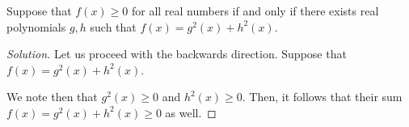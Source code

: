 \documentclass[openany]{book}
\newenvironment{solution}{\begin{proof}[Solution]}{\end{proof}}
\newcommand{\CC}{\mathbb{C}}
\newcommand{\RR}{\mathbb{R}}
\begin{document}
\begin{hw}
	Suppose that $f(x) \geq 0$ for all real numbers if and only if there exists real polynomials $g,h$ such that $f(x) = g^{2}(x) + h^{2}(x)$.
\end{hw}
\begin{solution}
	Let us proceed with the backwards direction. Suppose that $f(x) = g^{2}(x) + h^{2}(x)$.
	
	We note then that $g^{2}(x) \geq 0$ and  $h^{2}(x) \geq 0$. Then, it follows that their sum $f(x) = g^{2}(x) + h^{2}(x) \geq 0$ as well.
	
	\begin{comment}
		For the forward direction, suppose that $f(x) \geq 0$ for all real numbers. We observe then that, for $c, \lambda_i \in \RR$ and $\mu_j \in \CC$ for $i = 0, \ldots, n$ and $j = 0, \ldots, m$, we can rewrite $f(x)$ as follow:
	\begin{equation*}
		f(x) = c(x-\lambda_1)^{n_{1}} \cdots (x-\lambda_n)^{n_{n}}\left[ (x-\mu_1)(x-\overline{\mu_{1}}) \right]\cdots\left[ (x-\mu_n)(x-\overline{\mu_{n}}) \right].
	\end{equation*}

	Then, we observe that each of the $n_{1}, \ldots, n_{n}$ must be even for $f(x) \geq 0$ to be true; if the root has an odd-degree multiplicity, then at $\lambda_i$, the graph crosses the x-axis, and thus violates our condition of $f(x) \geq 0$.
	
	Additionally, since $c \in \RR$, we can rewrite it as the square of some other constant $a^{2} \in \RR$.
	
	From here, since each of the real roots have even multiplicity, we can decompose them down to the following form:
	\begin{equation*}
		f(x) = a^{2}(x-\lambda_1)^{2}\cdots(x-\lambda_m)^{2}\left[ (x-\mu_1)(x-\overline{\mu_{1}}) \right]\cdots\left[ (x-\mu_n)(x-\overline{\mu_{n}}) \right],
	\end{equation*}
	where $m \geq n$.

	From here, we can construct the following two polynomials:
	\begin{align*}
		g(x) &= a(x-\lambda_1)\cdots(x-\lambda_m) \\
		h(x) &= (x-\mu_1)\cdots(x-\mu_n)
	\end{align*}

	Furthermore, we note that we can in fact rewrite our polynomial $h(x)$ as the sum of two polynomials $h_{\mathrm{re}}, h_{\mathrm{im}}$
	\end{comment}


\end{solution}
\end{document}
